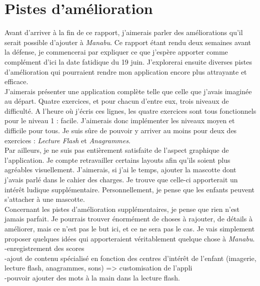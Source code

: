 \section{Pistes d'amélioration}
Avant d'arriver à la fin de ce rapport, j'aimerais parler des améliorations qu'il  serait possible d'ajouter à \textit{Manabu}. Ce rapport étant rendu deux semaines avant la défense, je commencerai par expliquer ce que j'espère apporter comme complément d'ici la date fatidique du 19 juin. J'explorerai ensuite diverses pistes d'amélioration qui pourraient rendre mon application encore plus attrayante et efficace.\\

J'aimerais présenter une application complète telle que celle que j'avais imaginée au départ. Quatre exercices, et pour chacun d'entre eux, trois niveaux de difficulté. A l'heure où j'écris ces lignes, les quatre exercices sont tous fonctionnels pour le niveau 1 : facile. J'aimerais donc implémenter les niveaux moyen et difficile pour tous. Je suis sûre de pouvoir y arriver au moins pour deux des exercices : \textit{Lecture Flash} et \textit{Anagrammes}.\\

Par ailleurs, je ne suis pas entièrement satisfaite de l'aspect graphique de l'application. Je compte retravailler certains layouts afin qu'ils soient plus agréables visuellement. J'aimerais, si j'ai le temps, ajouter la mascotte dont j'avais parlé dans le cahier des charges. Je trouve que celle-ci apporterait un intérêt ludique supplémentaire. Personnellement, je pense que les enfants peuvent s'attacher à une mascotte.\\

Concernant les pistes d'amélioration supplémentaires, je pense que rien n'est jamais parfait. Je pourrais trouver énormément de choses à rajouter, de détails à améliorer, mais ce n'est pas le but ici, et ce ne sera pas le cas. Je vais simplement proposer quelques idées qui apporteraient véritablement quelque chose à \textit{Manabu}.\\

-enregistrement des scores\\

-ajout de contenu spécialisé en fonction des centres d'intérêt de l'enfant (imagerie, lecture flash, anagrammes, sons) => customisation de l'appli\\

-pouvoir ajouter des mots à la main dans la lecture flash.